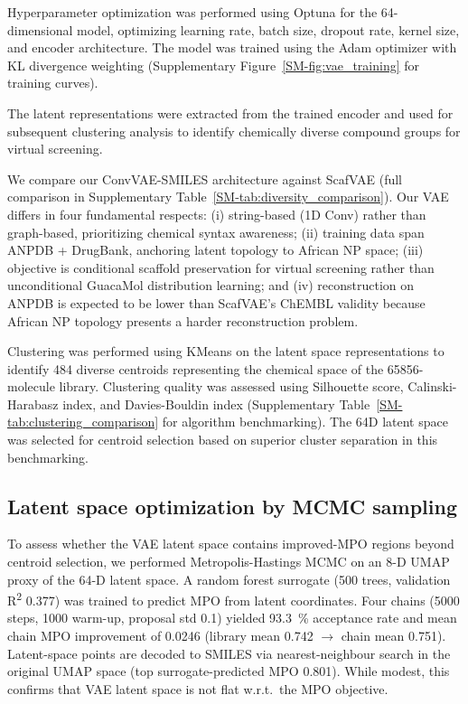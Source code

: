 \documentclass[journal=jcisd8,manuscript=article]{achemso}
\begin{document}
Hyperparameter optimization was performed using Optuna \cite{Akiba2019} for the \num{64}-dimensional model, optimizing learning rate, batch size, dropout rate, kernel size, and encoder architecture. The model was trained using the Adam optimizer with KL divergence weighting (Supplementary Figure~\ref{SM-fig:vae_training} for training curves).

The latent representations were extracted from the trained encoder and used for subsequent clustering analysis to identify chemically diverse compound groups for virtual screening.

We compare our ConvVAE-SMILES architecture against ScafVAE \cite{tiejundong2023scafvae} (full comparison in Supplementary Table~\ref{SM-tab:diversity_comparison}). Our VAE differs in four fundamental respects: (i) string-based (1D Conv) rather than graph-based, prioritizing chemical syntax awareness; (ii) training data span ANPDB + DrugBank, anchoring latent topology to African NP space; (iii) objective is conditional scaffold preservation for virtual screening rather than unconditional GuacaMol distribution learning; and (iv) reconstruction on ANPDB is expected to be lower than ScafVAE's ChEMBL validity because African NP topology presents a harder reconstruction problem.

Clustering was performed using KMeans on the latent space representations to identify \num{484} diverse centroids representing the chemical space of the \num{65856}-molecule library. Clustering quality was assessed using Silhouette score, Calinski-Harabasz index, and Davies-Bouldin index (Supplementary Table~\ref{SM-tab:clustering_comparison} for algorithm benchmarking). The 64D latent space was selected for centroid selection based on superior cluster separation in this benchmarking.

\subsection{Latent space optimization by MCMC sampling}

To assess whether the VAE latent space contains improved-MPO regions beyond centroid selection, we performed Metropolis-Hastings MCMC on an \num{8}-D UMAP proxy of the \num{64}-D latent space. A random forest surrogate (\num{500} trees, validation R\textsuperscript{2} \num{0.377}) was trained to predict MPO from latent coordinates. Four chains (\num{5000} steps, \num{1000} warm-up, proposal std \num{0.1}) yielded \qty{93.3}{\percent} acceptance rate and mean chain MPO improvement of \num{+0.0246} (library mean \num{0.742} $\to$ chain mean \num{0.751}). Latent-space points are decoded to SMILES via nearest-neighbour search in the original UMAP space (top surrogate-predicted MPO \num{0.801}). While modest, this confirms that VAE latent space is not flat w.r.t.\ the MPO objective.
\end{document}
